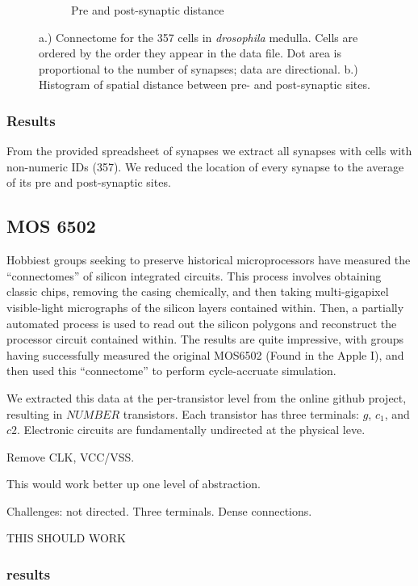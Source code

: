 \documentclass{article}
\begin{document}
\begin{figure}
\begin{subfigure}[b]{0.4\textwidth}
    \caption{Pre and post-synaptic distance}
    \label{fig:drosophila:distprepost}
  \end{subfigure}
  \caption{a.) Connectome for the 357 cells in \textit{drosophila} medulla. Cells are ordered by the order they appear in the data file. Dot area is proportional to the number of synapses; data are directional. b.) Histogram of spatial distance between pre- and post-synaptic sites.}
  \label{fig:drosophila_adj}
\end{figure}

\subsubsection{Results}
From the provided spreadsheet of synapses we extract all synapses with cells with non-numeric IDs (357). We reduced the location of every synapse to the average of its pre and post-synaptic sites. 



\subsection{MOS 6502}

Hobbiest groups seeking to preserve historical microprocessors have
measured the ``connectomes'' of silicon integrated circuits. This
process involves obtaining classic chips, removing the casing
chemically, and then taking multi-gigapixel visible-light micrographs
of the silicon layers contained within. Then, a partially automated
process is used to read out the silicon polygons and reconstruct the
processor circuit contained within. The results are quite impressive,
with groups having successfully measured the original MOS6502 (Found
in the Apple I), and then used this ``connectome'' to perform
cycle-accruate simulation.

We extracted this data at the per-transistor level from the online
github project, resulting in $NUMBER$ transistors. Each transistor has
three terminals: $g$, $c_1$, and $c2$. Electronic circuits are fundamentally
undirected at the physical leve. 

Remove CLK, VCC/VSS. 

This would work better up one level of abstraction. 


Challenges: not directed. Three terminals. Dense connections. 

THIS SHOULD WORK

\subsubsection{results}
\end{document}
